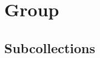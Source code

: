 \documentclass [12pt]{book}
\begin{document}











	\chapter{Group}

		\section{Subcollections}
\end{document}
